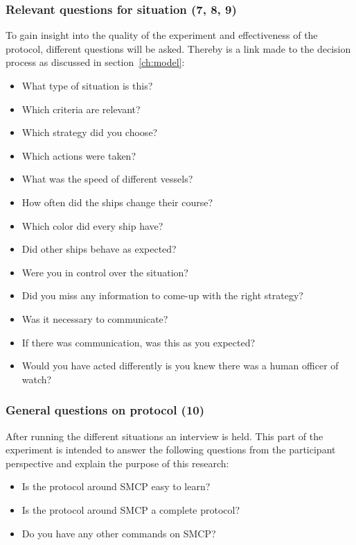 \subsubsection{Relevant questions for situation (7, 8, 9)}
To gain insight into the quality of the experiment and effectiveness of the protocol, different questions will be asked. Thereby is a link made to the decision process as discussed in section~\ref{ch:model}:
\begin{spacing}{1}
\begin{itemize}
	\item What type of situation is this?
	\item Which criteria are relevant?
	\item Which strategy did you choose?
	\item Which actions were taken?
	\item What was the speed of different vessels?
	\item How often did the ships change their course?
	\item Which color did every ship have?
	\item Did other ships behave as expected?
	\item Were you in control over the situation?
	\item Did you miss any information to come-up with the right strategy?
	\item Was it necessary to communicate?
	\item If there was communication, was this as you expected?
	\item Would you have acted differently is you knew there was a human officer of watch?
\end{itemize}
\end{spacing}

\subsubsection{General questions on protocol (10)}
After running the different situations an interview is held. This part of the experiment is intended to answer the following questions from the participant perspective and explain the purpose of this research:
\begin{spacing}{1}
\begin{itemize}
	\item Is the protocol around \ac{SMCP} easy to learn?
	\item Is the protocol around \ac{SMCP} a complete protocol?
	\item Do you have any other commands on \ac{SMCP}?
\end{itemize}
\end{spacing}

